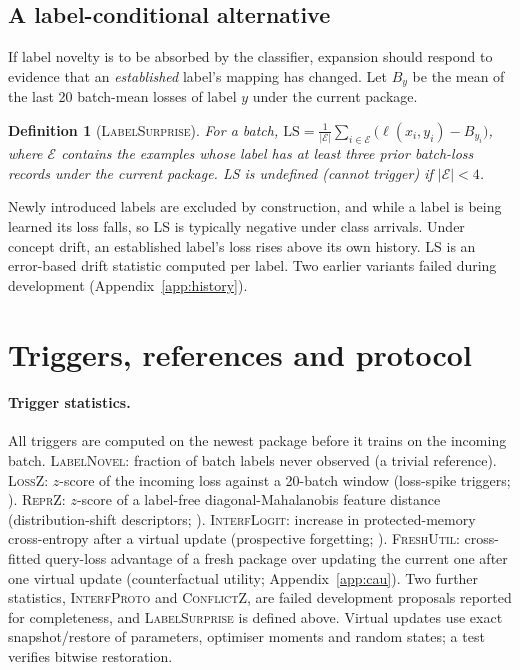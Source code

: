 \documentclass[10pt]{article}
\newtheorem{definition}{Definition}
\newcommand{\ls}{\textsc{LabelSurprise}}
\begin{document}
\subsection{A label-conditional alternative}
\label{sec:surprise}
If label novelty is to be absorbed by the classifier, expansion should respond to evidence that an \emph{established} label's mapping has changed. Let $B_y$ be the mean of the last 20 batch-mean losses of label $y$ under the current package.
\begin{definition}[\ls]
For a batch, $\mathrm{LS} = \frac{1}{|\mathcal{E}|}\sum_{i\in\mathcal{E}} \big(\ell(x_i,y_i) - B_{y_i}\big)$, where $\mathcal{E}$ contains the examples whose label has at least three prior batch-loss records under the current package. LS is undefined (cannot trigger) if $|\mathcal{E}|<4$.
\end{definition}
Newly introduced labels are excluded by construction, and while a label is being learned its loss falls, so LS is typically negative under class arrivals. Under concept drift, an established label's loss rises above its own history. LS is an error-based drift statistic \citep{gama2004ddm} computed per label. Two earlier variants failed during development (Appendix~\ref{app:history}).

\section{Triggers, references and protocol}
\label{sec:triggers}

\paragraph{Trigger statistics.} All triggers are computed on the newest package before it trains on the incoming batch. \textsc{LabelNovel}: fraction of batch labels never observed (a trivial reference). \textsc{LossZ}: $z$-score of the incoming loss against a 20-batch window (loss-spike triggers; \citealp{tathe2026lace,wei2025onlinelora}). \textsc{ReprZ}: $z$-score of a label-free diagonal-Mahalanobis feature distance (distribution-shift descriptors; \citealp{wang2025sema}). \textsc{InterfLogit}: increase in protected-memory cross-entropy after a virtual update (prospective forgetting; \citealp{julian2025cable}). \textsc{FreshUtil}: cross-fitted query-loss advantage of a fresh package over updating the current one after one virtual update (counterfactual utility; Appendix~\ref{app:cau}). Two further statistics, \textsc{InterfProto} and \textsc{ConflictZ}, are failed development proposals reported for completeness, and \ls{} is defined above. Virtual updates use exact snapshot/restore of parameters, optimiser moments and random states; a test verifies bitwise restoration.
\end{document}
